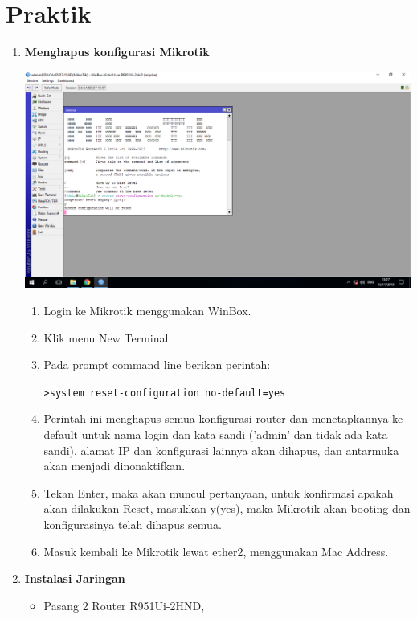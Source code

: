 \documentclass[a4paper,12pt]{article}
\begin{document}
\section{Praktik}
\begin{enumerate}
	\item {\bfseries Menghapus konfigurasi Mikrotik
}
	\begin{center}
	\includegraphics[scale=.4]{Page-1-Image-1}
	\end{center}	
	\begin{enumerate}[label=\alph*.]
		\item Login ke Mikrotik menggunakan WinBox.
		
		\item Klik menu New Terminal
		
		\item Pada prompt command line berikan perintah:
		
		\texttt{>system reset-configuration no-default=yes}
		
		\item Perintah ini menghapus semua konfigurasi router dan menetapkannya ke default untuk nama login dan kata sandi ('admin' dan tidak ada kata sandi), alamat IP dan konfigurasi lainnya akan dihapus, dan antarmuka akan menjadi dinonaktifkan.
		
		\item Tekan Enter, maka akan muncul pertanyaan, untuk konfirmasi apakah akan dilakukan Reset, masukkan y(yes), maka Mikrotik akan booting dan konfigurasinya telah dihapus semua.
		
		\item Masuk kembali ke Mikrotik lewat ether2, menggunakan Mac Address.
		
	\end{enumerate}
	
	\item {\bfseries Instalasi Jaringan\\}
	\begin{itemize}
		\item Pasang 2 Router R951Ui-2HND,
		

\end{itemize}
\end{enumerate}
\end{document}
